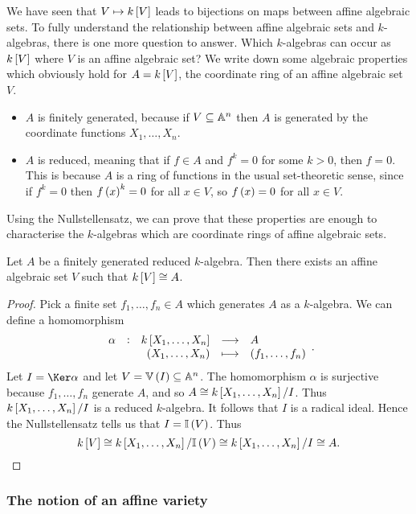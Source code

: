 
We have seen that $ V \mapsto k\sbr{V} $ leads to bijections on maps between affine algebraic sets. To fully understand the relationship between affine algebraic sets and $ k $-algebras, there is one more question to answer. Which $ k $-algebras can occur as $ k\sbr{V} $ where $ V $ is an affine algebraic set? We write down some algebraic properties which obviously hold for $ A = k\sbr{V} $, the coordinate ring of an affine algebraic set $ V $.
\begin{itemize}
\item $ A $ is finitely generated, because if $ V \subseteq \AA^n $ then $ A $ is generated by the coordinate functions $ X_1, \dots, X_n $.
\item $ A $ is reduced, meaning that if $ f \in A $ and $ f^k = 0 $ for some $ k > 0 $, then $ f = 0 $. This is because $ A $ is a ring of functions in the usual set-theoretic sense, since if $ f^k = 0 $ then $ f\br{x}^k = 0 $ for all $ x \in V $, so $ f\br{x} = 0 $ for all $ x \in V $.
\end{itemize}
Using the Nullstellensatz, we can prove that these properties are enough to characterise the $ k $-algebras which are coordinate rings of affine algebraic sets.

\begin{proposition}
\label{prop:kva}
Let $ A $ be a finitely generated reduced $ k $-algebra. Then there exists an affine algebraic set $ V $ such that $ k\sbr{V} \cong A $.
\end{proposition}

\begin{proof}
Pick a finite set $ f_1, \dots, f_n \in A $ which generates $ A $ as a $ k $-algebra. We can define a homomorphism
$$ \function[\alpha]{k\sbr{X_1, \dots, X_n}}{A}{\br{X_1, \dots, X_n}}{\br{f_1, \dots, f_n}}. $$
Let $ I = \Ker \alpha $ and let $ V = \VV\br{I} \subseteq \AA^n $. The homomorphism $ \alpha $ is surjective because $ f_1, \dots, f_n $ generate $ A $, and so $ A \cong k\sbr{X_1, \dots, X_n} / I $. Thus $ k\sbr{X_1, \dots, X_n} / I $ is a reduced $ k $-algebra. It follows that $ I $ is a radical ideal. Hence the Nullstellensatz tells us that $ I = \II\br{V} $. Thus
$$ k\sbr{V} \cong k\sbr{X_1, \dots, X_n} / \II\br{V} \cong k\sbr{X_1, \dots, X_n} / I \cong A. $$
\end{proof}

\pagebreak

\subsubsection{The notion of an affine variety}

